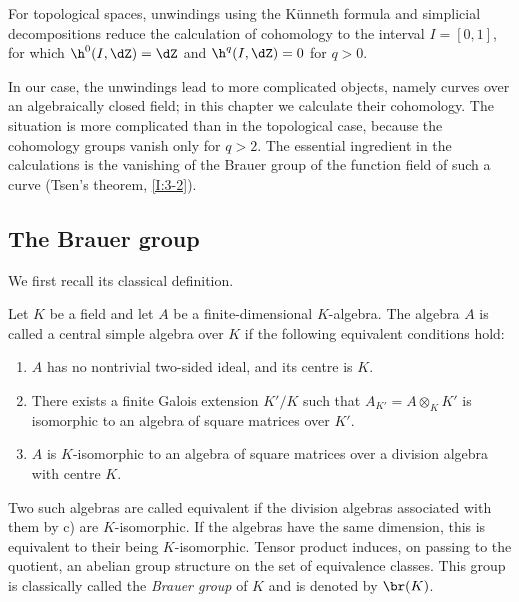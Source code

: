 \documentclass[oneside]{book}
\begin{document}
For topological spaces, unwindings using the K\"unneth formula and
simplicial decompositions reduce the calculation of cohomology to the
interval $I=[0,1]$, for which $\h^0(I,\dZ)=\dZ$ and
$\h^q(I,\dZ)=0$ for $q>0$.

In our case, the unwindings lead to more complicated objects, namely curves
over an algebraically closed field; in this chapter we calculate their
cohomology. The situation is more complicated than in the topological case,
because the cohomology groups vanish only for $q>2$. The essential
ingredient in the calculations is the vanishing of the Brauer group of the
function field of such a curve (Tsen's theorem, \ref{I:3-2}).

\subsection{The Brauer group}\label{I:3-1}

We first recall its classical definition.

\begin{definition}\label{I:3-1-1}
Let $K$ be a field and let $A$ be a finite-dimensional $K$-algebra. The
algebra $A$ is called a central simple algebra over $K$ if the following
equivalent conditions hold:
\begin{enumerate}[\indent a)]
  \item $A$ has no nontrivial two-sided ideal, and its centre is $K$.
  \item There exists a finite Galois extension $K'/K$ such that
    $A_{K'}=A\otimes_KK'$ is isomorphic to an algebra of square matrices
    over $K'$.
  \item $A$ is $K$-isomorphic to an algebra of square matrices over a
    division algebra with centre $K$.
\end{enumerate}
\end{definition}

Two such algebras are called equivalent if the division algebras associated
with them by c) are $K$-isomorphic. If the algebras have the same
dimension, this is equivalent to their being $K$-isomorphic. Tensor product
induces, on passing to the quotient, an abelian group structure on the set
of equivalence classes. This group is classically called the
\emph{Brauer group} of $K$ and is denoted by $\br(K)$.

\subsubsection{}\label{I:3-1-2}
\end{document}
